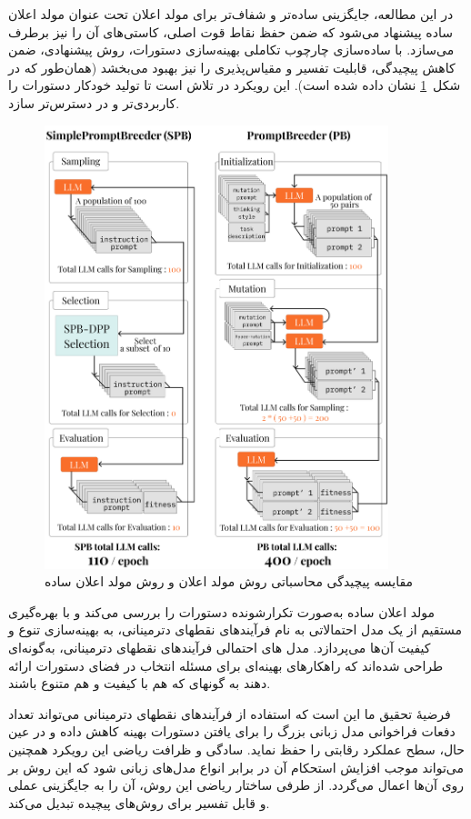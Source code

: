 در این مطالعه، جایگزینی ساده‌تر و شفاف‌تر برای مولد اعلان تحت عنوان مولد اعلان ساده
 پیشنهاد می‌شود که ضمن حفظ نقاط قوت اصلی، کاستی‌های آن را نیز برطرف می‌سازد.
با ساده‌سازی چارچوب تکاملی بهینه‌سازی دستورات، روش پیشنهادی، ضمن کاهش پیچیدگی، قابلیت تفسیر و مقیاس‌پذیری را نیز بهبود می‌بخشد (همان‌طور که در شکل~\ref{fig_teaser} نشان داده شده است).
این رویکرد در تلاش است تا تولید خودکار دستورات را کاربردی‌تر و در دسترس‌تر سازد.

 \begin{figure}[!t]
	\centering
	\includegraphics[width=100mm]{images/tf}
	\caption{مقایسه پیچیدگی محاسباتی روش مولد اعلان و روش مولد اعلان ساده}
	\label{fig_teaser}
\end{figure}

مولد اعلان ساده به‌صورت تکرارشونده دستورات را بررسی می‌کند و با بهره‌گیری مستقیم از یک مدل احتمالاتی به نام فرآیندهای نقطه\/ای دترمینانی، به بهینه‌سازی تنوع و کیفیت آن‌ها می‌پردازد. مدل های احتمالی فرآیندهای نقطه\/ای دترمینانی، به‌گونه‌ای طراحی شده‌اند که راهکارهای بهینه‌ای برای مسئله انتخاب در فضای دستورات ارائه دهند به گونه\/ای که هم با کیفیت و هم متنوع باشند.
 
فرضیهٔ تحقیق ما این است که استفاده از فرآیندهای نقطه\/ای دترمینانی می‌تواند تعداد دفعات فراخوانی مدل زبانی بزرگ را برای یافتن دستورات بهینه کاهش داده و در عین حال، سطح عملکرد رقابتی را حفظ نماید.
سادگی و ظرافت ریاضی این رویکرد همچنین می‌تواند موجب افزایش استحکام آن در برابر انواع مدل‌های زبانی شود که این روش بر روی آن‌ها اعمال می‌گردد.
از طرفی  ساختار ریاضی این روش، آن را به جایگزینی عملی و قابل تفسیر برای روش‌های پیچیده تبدیل می‌کند.





